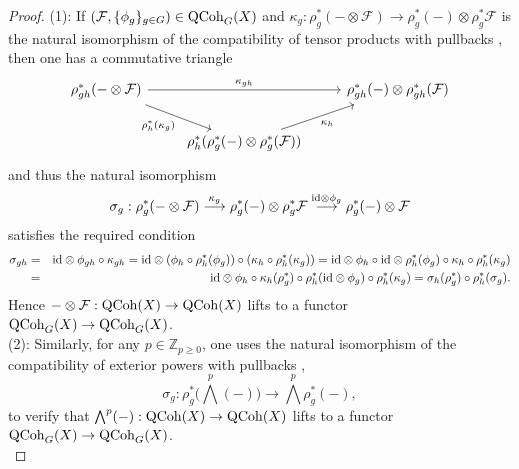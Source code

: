 \documentclass[10pt]{amsart}
\theoremstyle{definition}
\begin{document}
\begin{proof}
(1): If $(\mathcal{F},\{\phi_g\}_{g\in G})\in {\rm QCoh}_G(X)$ and $\kappa_g:\rho_g^*(-\otimes \mathcal{F})\rightarrow\rho_g^*(-)\otimes \rho_g^*\mathcal{F}$ is the natural isomorphism of the compatibility of tensor products with pullbacks \cite[II.5.16(e)]{Hartshorne:77}, then one has a commutative triangle
\[
\begin{tikzcd}
\rho_{gh}^*(-\otimes \mathcal{F}) \arrow[rr, "\kappa_{gh}"] \arrow[dr,"\rho_h^*(\kappa_g)"'] & & 
\rho^*_{gh}(-)\otimes\rho^*_{gh}(\mathcal{F}) \\
& \rho_h^*(\rho_g^*(-)\otimes\rho_g^*(\mathcal{F}) )  \arrow[ur,"\kappa_h"'] & 
\end{tikzcd}
\]
and thus the natural isomorphism
\[
\sigma_g:\rho_g^*(-\otimes \mathcal{F})\overset{\kappa_g}{\longrightarrow}\rho_g^*(-)\otimes \rho_g^*\mathcal{F}\overset{{\rm id}\otimes\phi_g}{\longrightarrow}\rho_g^*(-)\otimes \mathcal{F}
\]
satisfies the required condition
\begin{eqnarray*}
\sigma_{gh}
&=&{\rm id}\otimes \phi_{gh}\circ\kappa_{gh}
=
{\rm id} \otimes (\phi_h\circ \rho_h^*(\phi_g))\circ (\kappa_h\circ \rho_h^*(\kappa_g))
=
{\rm id}\otimes\phi_h \circ {\rm id}\otimes\rho_h^*(\phi_g)\circ \kappa_h\circ\rho_h^*(\kappa_g)
\\
&=&{\rm id}\otimes\phi_h \circ \kappa_h(\rho_g^*)\circ\rho_h^*({\rm id}\otimes\phi_g)\circ\rho_h^*(\kappa_g)
=\sigma_h(\rho_g^*)\circ\rho_h^*(\sigma_g).
\end{eqnarray*}
Hence $-\otimes \mathcal{F}:{\rm QCoh}(X)\rightarrow{\rm QCoh}(X)$ lifts to a functor ${\rm QCoh}_G(X)\rightarrow{\rm QCoh}_G(X)$.\\

(2):  Similarly, for any $p\in\mathbb{Z}_{p\geq 0}$, one uses the natural isomorphism of the compatibility of exterior powers with pullbacks \cite[7.8.(3)]{MR4225278},
\[
\sigma_g:\rho_g^*\big(\bigwedge^p(-)\big)
\rightarrow
\bigwedge^p\rho_g^*(-),
\]
to verify that $\bigwedge^p(-):{\rm QCoh}(X)\rightarrow {\rm QCoh}(X)$ lifts to a functor ${\rm QCoh}_G(X)\rightarrow{\rm QCoh}_G(X)$.\\


\end{proof}
\end{document}
